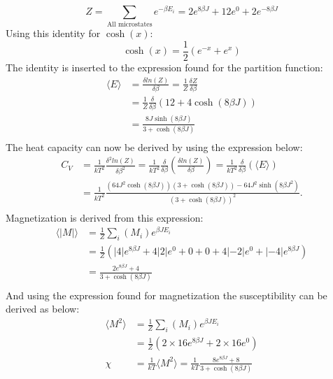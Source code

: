 \documentclass{emulateapj}
\begin{document}
%
\begin{equation*}
    Z = \sum_{ \text{All microstates}} e^{-\beta E_{i}} = 2e^{8\beta J} + 12e^{0} + 2e^{-8\beta J}
\end{equation*}
%
Using this identity for $\cosh(x)$:
%
\begin{equation*}
    \cosh(x) = \frac{1}{2} (e^{-x} + e^{x})
\end{equation*}
%
The identity is inserted to the expression found for the partition function:
%
\begin{align*}
    \langle E \rangle &= \frac{\delta ln(Z)}{\delta \beta} = \frac{1}{Z}\frac{\delta Z}{\delta \beta}\\
    &= \frac{1}{Z}\frac{\delta }{\delta \beta} (12 + 4 \cosh(8\beta J))\\
    &= \frac{8 J \sinh({8 \beta J})}{3 +  \cosh({8\beta J})}\\
\end{align*}
%
The heat capacity can now be derived by using the expression below:
%
\begin{align*}
    C_{V} &= \frac{1}{kT^2} \frac{\delta^2 ln(Z)}{\delta \beta^2} = \frac{1}{kT^2} \frac{\delta}{\delta \beta}(\frac{\delta ln(Z)}{\delta \beta})
    = \frac{1}{kT^2} \frac{\delta}{\delta \beta}(\langle E \rangle)\\
    &= \frac{1}{kT^2}\frac{(64 J^2 \cosh({8 \beta J}))(3 + \cosh (8 \beta J)) - 64 J^2 \sinh({8 \beta J}^2)}{(3 + \cosh (8 \beta J))^2}.\\
\end{align*}
%
Magnetization is derived from this expression:
%
\begin{align*}
    \langle |M| \rangle &= \frac{1}{Z} \sum_{i} (M_{i})e^{\beta J E_{i}} \\
    &= \frac{1}{Z}(|4|e^{8\beta J} + 4|2|e^{0} + 0 + 0 + 4|-2|e^{0} + |-4|e^{8\beta J}) \\
    &= \frac{2e^{8\beta J}+4}{3 + \cosh(8\beta J)} \\
\end{align*}
%
And using the expression found for magnetization the susceptibility can be derived as below:
%
\begin{align*}
    \langle M^2 \rangle &= \frac{1}{Z} \sum_{i} (M_{i})e^{\beta J E_{i}} \\
    &= \frac{1}{Z} (2 \times 16e^{8\beta J} + 2 \times 16e^{0}) \\
    \chi &= \frac{1}{kT}\langle M^2 \rangle = \frac {1}{kT} \frac{8e^{8\beta J} + 8}{3+\cosh(8\beta J)}\\
\end{align*}
\end{document}
